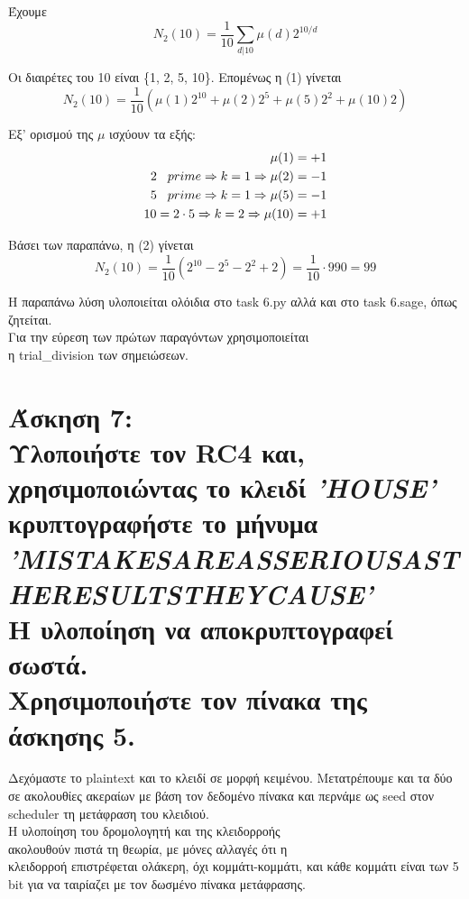 \documentclass{article}
\newcommand{\blank}[1]{\hspace*{#1}}
\newcommand{\myspace}{\blank{0.3cm}}
\newcommand{\lt}[1]{\latintext #1\greektext}
\newcommand{\task}[2]{\newpage\section*{Άσκηση #1:\\#2}}
\begin{document}
Έχουμε
\begin{equation}
    N_2(10) = \frac{1}{10}\sum_{d|10}\mu(d)2^{10/d}
\end{equation}

Οι διαιρέτες του 10 είναι \{1, 2, 5, 10\}. Επομένως η (1) γίνεται
\begin{equation}
    N_2(10) = \frac{1}{10}(\mu(1)2^{10} + \mu(2)2^5 + \mu(5)2^2 + \mu(10)2)
\end{equation}

Εξ' ορισμού της $\mu$ ισχύουν τα εξής:
\begin{align*}
    \mu(1) &= +1\\
    2 \myspace prime \Rightarrow k = 1 \Rightarrow  \mu(2) &= -1\\
    5 \myspace prime \Rightarrow k = 1 \Rightarrow  \mu(5) &= -1\\
    10 = 2\cdot5     \Rightarrow k = 2 \Rightarrow  \mu(10) &= +1
\end{align*}

\newpage
Βάσει των παραπάνω, η (2) γίνεται
\begin{equation*}
    N_2(10) = \frac{1}{10}(2^{10} - 2^5 - 2^2 + 2) = \frac{1}{10}\cdot990 = 99
\end{equation*}

Η παραπάνω λύση υλοποιείται ολόιδια στο \lt{task 6.py} αλλά και στο \lt{task 6.sage}, όπως ζητείται.\\ Για την εύρεση των πρώτων παραγόντων χρησιμοποιείται\\ η \lt{trial\_division} των σημειώσεων.

\task{7}{
    Υλοποιήστε τον \lt{RC4} και, χρησιμοποιώντας το κλειδί \textit{\lt{\large'HOUSE'}} \Large κρυπτογραφήστε το μήνυμα\\
    \textit{\lt{\normalsize'MISTAKESAREASSERIOUSASTHERESULTSTHEYCAUSE'}}\\
    \Large Η υλοποίηση να αποκρυπτογραφεί σωστά.\\ Χρησιμοποιήστε τον πίνακα της άσκησης 5.
}

Δεχόμαστε το \lt{plaintext} και το κλειδί σε μορφή κειμένου. Μετατρέπουμε και τα δύο σε ακολουθίες ακεραίων με βάση τον δεδομένο πίνακα και περνάμε ως \lt{seed} στον \lt{scheduler} τη μετάφραση του κλειδιού.\\

Η υλοποίηση του δρομολογητή και της κλειδορροής\\ ακολουθούν πιστά τη θεωρία, με μόνες αλλαγές ότι η\\ κλειδορροή επιστρέφεται ολάκερη, όχι κομμάτι-κομμάτι, και κάθε κομμάτι είναι των 5 \lt{bit} για να ταιρίαζει με τον δωσμένο πίνακα μετάφρασης.\\
\end{document}
